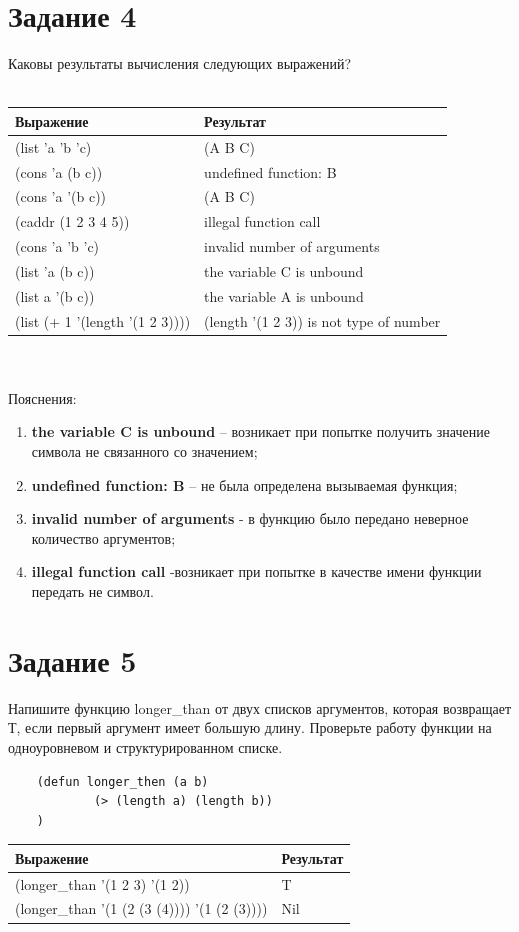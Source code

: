 \documentclass[a4paper, 12pt]{article}
\begin{document}
\section*{Задание 4}
Каковы результаты вычисления следующих выражений?\\ \\
\hspace*{20mm}\begin{tabular}{ | l | l | }
	\hline
	\textbf{Выражение} & \textbf{Результат} \\ \hline
	(list 'a 'b 'c) & (A B C) \\ \hline
	(cons 'a (b c)) & undefined function: B \\ \hline
	(cons 'a '(b c)) & (A B C) \\ \hline
	(caddr (1 2 3 4 5)) & illegal function call \\ \hline
	(cons 'a 'b 'c) & invalid number of arguments \\ \hline
	(list 'a (b c)) & the variable C is unbound \\ \hline
	(list a '(b c)) & the variable A is unbound \\ \hline
	(list (+ 1 '(length '(1 2 3)))) & (length '(1 2 3)) is not type of number \\ \hline
\end{tabular}
\\ \\ Пояснения:
\begin{enumerate}
	\item \textbf{the variable C is unbound} – возникает при попытке получить значение символа не связанного со значением;
	\item \textbf{undefined function: B} – не была определена вызываемая функция;
	\item \textbf{invalid number of arguments} - в функцию было передано неверное количество аргументов;
	\item \textbf{illegal function call} -возникает при попытке в качестве имени функции передать не символ.
\end{enumerate}

\section*{Задание 5}
Напишите функцию longer\_than от двух списков аргументов, которая возвращает Т, если первый аргумент имеет большую длину. Проверьте работу функции на одноуровневом и структурированном списке.\\
\begin{lstlisting}
	(defun longer_then (a b)
			(> (length a) (length b))
	)
\end{lstlisting}
\hspace*{20mm}\begin{tabular}{ | l | l | }
	\hline
	\textbf{Выражение} & \textbf{Результат} \\ \hline
	(longer\_than '(1 2 3) '(1 2)) & T \\ \hline
	(longer\_than '(1 (2 (3 (4)))) '(1 (2 (3)))) & Nil \\ \hline
\end{tabular}
\end{document}
